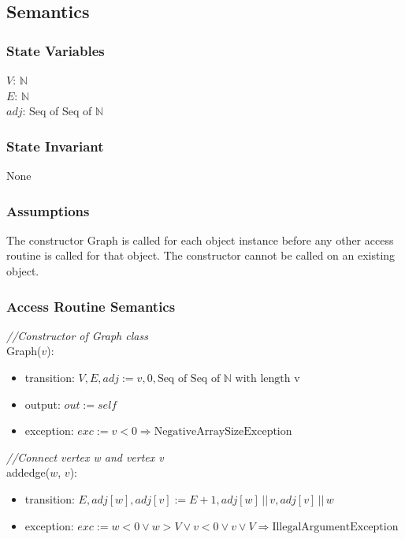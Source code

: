 \documentclass[12pt]{article}
\begin{document}
\subsection* {Semantics}

\subsubsection* {State Variables}

$V$: $\mathbb{N}$\\
$E$: $\mathbb{N}$\\
$adj$: Seq of Seq of $\mathbb{N}$

\subsubsection* {State Invariant}

None
\subsubsection* {Assumptions}

The constructor Graph is called for each object instance before any other access routine is called for that object.  The constructor cannot be called on
an existing object.

\subsubsection* {Access Routine Semantics}

\noindent \textit{//Constructor of Graph class}\\
Graph($v$):
\begin{itemize}
\item transition: $V, E, adj := v, 0, \mbox{Seq of Seq of   }\mathbb{N}\mbox{ with length v}$
\item output: $out := \mathit{self}$
\item exception: $exc := v < 0 \Rightarrow \mbox{NegativeArraySizeException}$
\end{itemize}

\noindent \textit{//Connect vertex w and vertex v}\\
\noindent addedge($w$, $v$):
\begin{itemize}
\item transition: $E, adj[w], adj[v] := E + 1, adj[w] \,||\, v, adj[v] \,||\, w$
\item exception: $exc := w < 0 \lor w > V  \lor v < 0 \lor v \lor V \Rightarrow \mbox{IllegalArgumentException}$
\end{itemize}
\end{document}
